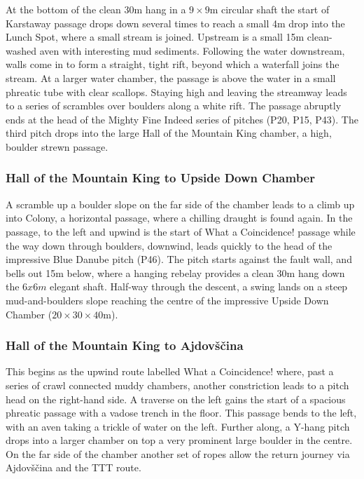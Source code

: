 At the bottom of the clean 30m hang in a \(9\times9\)m circular shaft the start of Karstaway passage drops down several times to reach a small 4m drop into the Lunch Spot, where a small stream is joined. Upstream is a small 15m clean-washed aven with interesting mud sediments. Following the water downstream, walls come in to form a straight, tight rift, beyond which a waterfall joins the stream. At a larger water chamber, the passage is above the water in a small phreatic tube with clear scallops. Staying high and leaving the streamway leads to a series of scrambles over boulders along a white rift. The passage abruptly ends at the head of the Mighty Fine Indeed series of pitches (P20, P15, P43). The third pitch drops into the large Hall of the Mountain King chamber, a high, boulder strewn passage.

\hypertarget{hall-of-the-mountain-king-to-upside-down-chamber}{%
\subsubsection{Hall of the Mountain King to Upside Down Chamber}\label{hall-of-the-mountain-king-to-upside-down-chamber}}

A scramble up a boulder slope on the far side of the chamber leads to a climb up into Colony, a horizontal passage, where a chilling draught is found again. In the passage, to the left and upwind is the start of What a Coincidence! passage while the way down through boulders, downwind, leads quickly to the head of the impressive Blue Danube pitch (P46). The pitch starts against the fault wall, and bells out 15m below, where a hanging rebelay provides a clean 30m hang down the \(6x6m\) elegant shaft. Half-way through the descent, a swing lands on a steep mud-and-boulders slope reaching the centre of the impressive Upside Down Chamber (\(20\times30\times40\)m).

\hypertarget{hall-of-the-mountain-king-to-ajdovux161ux10dina}{%
\subsubsection{Hall of the Mountain King to Ajdovščina}\label{hall-of-the-mountain-king-to-ajdovux161ux10dina}}

This begins as the upwind route labelled What a Coincidence! where, past a series of crawl connected muddy chambers, another constriction leads to a pitch head on the right-hand side. A traverse on the left gains the start of a spacious phreatic passage with a vadose trench in the floor. This passage bends to the left, with an aven taking a trickle of water on the left. Further along, a Y-hang pitch drops into a larger chamber on top a very prominent large boulder in the centre. On the far side of the chamber another set of ropes allow the return journey via Ajdovščina and the TTT route.

